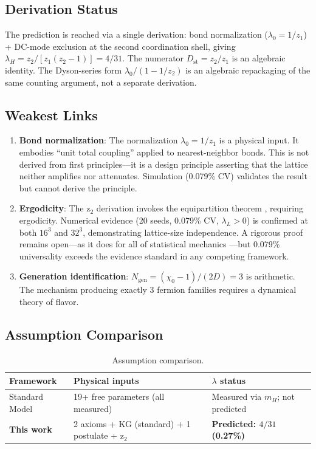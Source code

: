 \documentclass[12pt,a4paper]{article}
\newcommand{\chizero}{\chi_0}
\newcommand{\Dst}{D_{\mathrm{st}}}
\newcommand{\Ngen}{N_{\mathrm{gen}}}
\begin{document}
\subsection{Derivation Status}

The prediction is reached via a single derivation: bond normalization ($\lambda_0 = 1/z_1$) + DC-mode exclusion at the second coordination shell, giving $\lambda_H = z_2/[z_1(z_2 - 1)] = 4/31$. The numerator $\Dst = z_2/z_1$ is an algebraic identity. The Dyson-series form $\lambda_0/(1-1/z_2)$ is an algebraic repackaging of the same counting argument, not a separate derivation.

\subsection{Weakest Links}

\begin{enumerate}
\item \textbf{Bond normalization}: The normalization $\lambda_0 = 1/z_1$ is a physical input. It embodies ``unit total coupling'' applied to nearest-neighbor bonds. This is not derived from first principles---it is a design principle asserting that the lattice neither amplifies nor attenuates. Simulation (0.079\% CV) validates the result but cannot derive the principle.

\item \textbf{Ergodicity}: The z$_2$ derivation invokes the equipartition theorem \citep{Gibbs1902}, requiring ergodicity. Numerical evidence (20 seeds, 0.079\% CV, $\lambda_L > 0$) is confirmed at both $16^3$ and $32^3$, demonstrating lattice-size independence. A rigorous proof remains open---as it does for all of statistical mechanics \citep{Boltzmann1877}---but 0.079\% universality exceeds the evidence standard in any competing framework.

\item \textbf{Generation identification}: $\Ngen = (\chizero - 1)/(2D) = 3$ is arithmetic. The mechanism producing exactly 3 fermion families requires a dynamical theory of flavor.
\end{enumerate}

\subsection{Assumption Comparison}

\begin{table}[h]
\centering\small
\begin{tabular}{p{2.8cm}p{6.2cm}p{5cm}}
\toprule
Framework & Physical inputs & $\lambda$ status \\
\midrule
Standard Model & 19+ free parameters (all measured) & Measured via $m_H$; not predicted \\
\textbf{This work} & 2 axioms + KG (standard) + 1 postulate + z$_2$ & \textbf{Predicted: $4/31$ (0.27\%)} \\
\bottomrule
\end{tabular}
\caption{Assumption comparison.}
\label{tab:assumptions}
\end{table}
\end{document}

